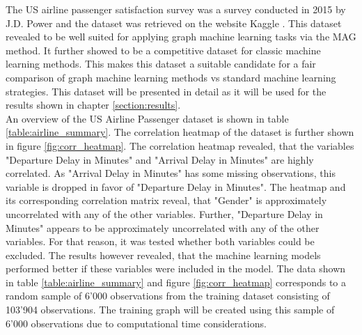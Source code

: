   The US airline passenger satisfaction survey was a survey conducted in 2015
  by J.D. Power and the dataset was retrieved on the website Kaggle
  \citep{JDPower2015,KAGGLE2015}. This dataset revealed to be well suited for
  applying graph machine learning tasks via the MAG method. It further showed
  to be a competitive dataset for classic machine learning methods. This makes
  this dataset a suitable candidate for a fair comparison of graph machine 
  learning methods vs standard machine learning strategies. This dataset will be
  presented in detail as it will be used for the results shown in chapter 
  \ref{section:results}. \\

  \noindent An overview of the US Airline Passenger dataset is shown in table
  \ref{table:airline_summary}. The correlation heatmap of the dataset is
  further shown in figure \ref{fig:corr_heatmap}. The correlation heatmap
  revealed, that the variables "Departure Delay in Minutes" and "Arrival Delay
  in Minutes" are highly correlated. As "Arrival Delay in Minutes" has some
  missing observations, this variable is dropped in favor of "Departure Delay 
  in Minutes". The heatmap and its corresponding correlation matrix reveal,
  that "Gender" is approximately uncorrelated with any of the other variables.
  Further, "Departure Delay in Minutes" appears to be approximately
  uncorrelated with any of the other variables. For that reason, it was tested
  whether both variables could be excluded. The results however revealed, that
  the machine learning models performed better if these variables were included 
  in the model. The data shown in table \ref{table:airline_summary} and 
  figure \ref{fig:corr_heatmap} corresponds to a random sample of 6’000 
  observations from the training dataset consisting of 103’904 observations.
  The training graph will be created using this sample of 6'000 observations due
  to computational time considerations. 

